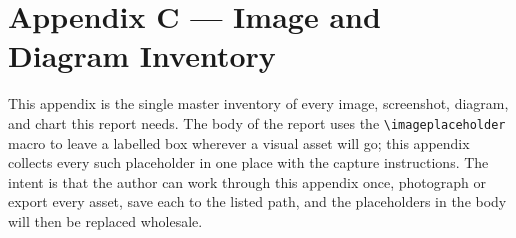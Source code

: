 \chapter*{Appendix C --- Image and Diagram Inventory}
\label{appendix:images}

This appendix is the single master inventory of every image,
screenshot, diagram, and chart this report needs. The body of
the report uses the \texttt{\textbackslash imageplaceholder}
macro to leave a labelled box wherever a visual asset will go;
this appendix collects every such placeholder in one place with
the capture instructions. The intent is that the author can
work through this appendix once, photograph or export every
asset, save each to the listed path, and the placeholders in
the body will then be replaced wholesale.


